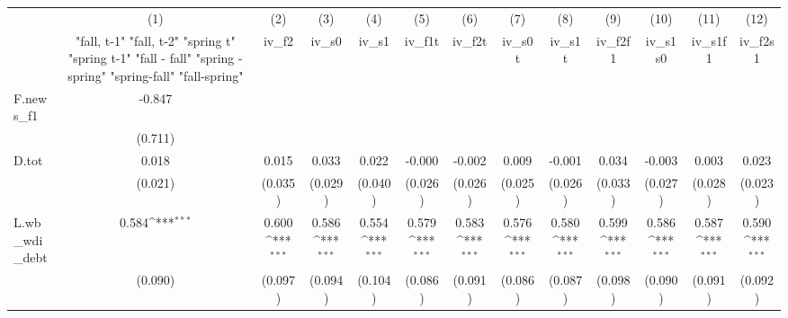 {
\def\sym#1{\ifmmode^{#1}\else\(^{#1}\)\fi}
\begin{tabular}{l*{12}{c}}
\toprule
            &\multicolumn{1}{c}{(1)}&\multicolumn{1}{c}{(2)}&\multicolumn{1}{c}{(3)}&\multicolumn{1}{c}{(4)}&\multicolumn{1}{c}{(5)}&\multicolumn{1}{c}{(6)}&\multicolumn{1}{c}{(7)}&\multicolumn{1}{c}{(8)}&\multicolumn{1}{c}{(9)}&\multicolumn{1}{c}{(10)}&\multicolumn{1}{c}{(11)}&\multicolumn{1}{c}{(12)}\\
            &\multicolumn{1}{c}{  "fall, t-1" "fall, t-2" "spring t" "spring t-1"  "fall - fall" "spring - spring" "spring-fall" "fall-spring" }&\multicolumn{1}{c}{iv\_f2}&\multicolumn{1}{c}{iv\_s0}&\multicolumn{1}{c}{iv\_s1}&\multicolumn{1}{c}{iv\_f1t}&\multicolumn{1}{c}{iv\_f2t}&\multicolumn{1}{c}{iv\_s0t}&\multicolumn{1}{c}{iv\_s1t}&\multicolumn{1}{c}{iv\_f2f1}&\multicolumn{1}{c}{iv\_s1s0}&\multicolumn{1}{c}{iv\_s1f1}&\multicolumn{1}{c}{iv\_f2s1}\\
\midrule
F.news\_f1   &      -0.847         &                     &                     &                     &                     &                     &                     &                     &                     &                     &                     &                     \\
            &     (0.711)         &                     &                     &                     &                     &                     &                     &                     &                     &                     &                     &                     \\
\addlinespace
D.tot       &       0.018         &       0.015         &       0.033         &       0.022         &      -0.000         &      -0.002         &       0.009         &      -0.001         &       0.034         &      -0.003         &       0.003         &       0.023         \\
            &     (0.021)         &     (0.035)         &     (0.029)         &     (0.040)         &     (0.026)         &     (0.026)         &     (0.025)         &     (0.026)         &     (0.033)         &     (0.027)         &     (0.028)         &     (0.023)         \\
\addlinespace
L.wb\_wdi\_debt&       0.584\sym{***}&       0.600\sym{***}&       0.586\sym{***}&       0.554\sym{***}&       0.579\sym{***}&       0.583\sym{***}&       0.576\sym{***}&       0.580\sym{***}&       0.599\sym{***}&       0.586\sym{***}&       0.587\sym{***}&       0.590\sym{***}\\
            &     (0.090)         &     (0.097)         &     (0.094)         &     (0.104)         &     (0.086)         &     (0.091)         &     (0.086)         &     (0.087)         &     (0.098)         &     (0.090)         &     (0.091)         &     (0.092)         \\

\end{tabular}}
